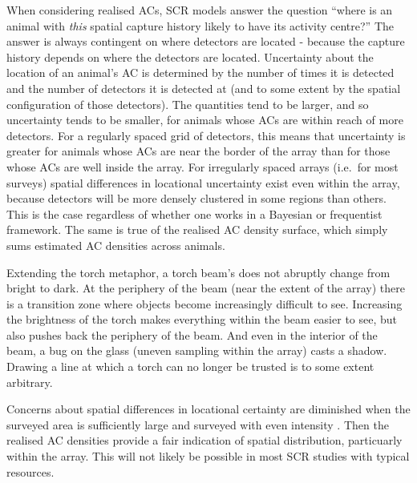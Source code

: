 \documentclass[useAMS,usenatbib,referee]{biom}
\begin{document}
When considering realised ACs, SCR models answer the question ``where is an animal with {\it this} spatial capture history likely to have its activity centre?'' The answer is always contingent on where detectors are located - because the capture history depends on where the detectors are located. Uncertainty about the location of an animal's AC is determined by the number of times it is detected and the number of detectors it is detected at (and to some extent by the spatial configuration of those detectors). The quantities tend to be larger, and so uncertainty tends to be smaller, for animals whose ACs are within reach of more detectors. For a regularly spaced grid of detectors, this means that uncertainty is greater for animals whose ACs are near the border of the array than for those whose ACs are well inside the array. For irregularly spaced arrays (i.e.\ for most surveys) spatial differences in locational uncertainty exist even within the array, because detectors will be more densely clustered in some regions than others. This is the case regardless of whether one works in a Bayesian or frequentist framework. The same is true of the realised AC density surface, which simply sums estimated AC densities across animals. 

Extending the torch metaphor, a torch beam's does not abruptly change from bright to dark. At the periphery of the beam (near the extent of the array) there is a transition zone where objects become increasingly difficult to see. Increasing the brightness of the torch makes everything within the beam easier to see, but also pushes back the periphery of the beam. And even in the interior of the beam, a bug on the glass (uneven sampling within the array) casts a shadow. Drawing a line at which a torch can no longer be trusted is to some extent arbitrary. 

Concerns about spatial differences in locational certainty are diminished when the surveyed area is sufficiently large and surveyed with even intensity \citep[e.g.][]{Bischof2020}. Then the realised AC densities provide a fair indication of spatial distribution, particuarly within the array. This will not likely be possible in most SCR studies with typical resources.

\end{document}
